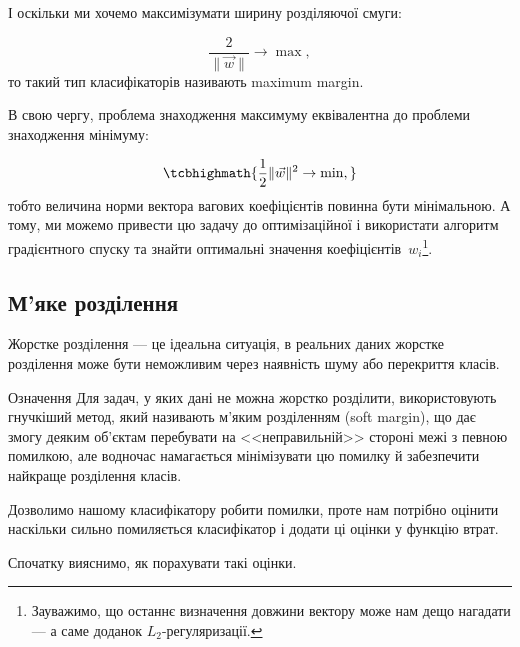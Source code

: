 \documentclass[]{article}
\begin{document}
І оскільки ми хочемо максимізумати ширину розділяючої смуги:

\begin{equation*}
    \dfrac2{\|\vec{w}\|} \to \max,
\end{equation*}
то такий тип класифікаторів називають maximum margin.

В свою чергу, проблема знаходження максимуму еквівалентна до проблеми знаходження мінімуму:

\begin{equation*}
   \tcbhighmath{\frac12 \|\vec{w}\|^2 \to \min,}
\end{equation*}
тобто величина норми вектора вагових коефіцієнтів повинна бути мінімальною. А тому, ми можемо привести цю задачу до оптимізаційної і використати алгоритм градієнтного спуску та знайти оптимальні значення коефіцієнтів~$w_i$\footnote{Зауважимо, що останнє визначення довжини вектору може нам дещо нагадати --- а саме доданок $L_2$-регуляризації.}.



\subsection{М'яке розділення}

Жорстке розділення --- це ідеальна ситуація, в реальних даних жорстке розділення може бути неможливим через наявність шуму або перекриття класів.

\begin{defbox}{Означення}
Для задач, у яких дані не можна жорстко розділити, використовують гнучкіший метод, який називають м'яким розділенням (soft margin), що дає змогу деяким об'єктам перебувати на <<неправильній>> стороні межі з певною помилкою, але водночас намагається мінімізувати цю помилку й забезпечити найкраще розділення класів.
\end{defbox}



Дозволимо нашому класифікатору робити помилки, проте нам потрібно оцінити наскільки сильно помиляється класифікатор і додати ці оцінки у функцію втрат.

Спочатку вияснимо, як порахувати такі оцінки.
\end{document}
